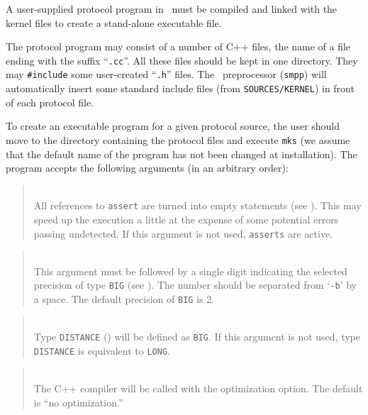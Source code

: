 A user-supplied protocol program in \smurph\ must
be compiled and linked with the kernel
files to create a stand-alone executable file.

The protocol program may consist of a number of C++ files, the name of
a file ending with the suffix ``{\tt .cc}''.
All these files should be kept in one directory.
They may {\tt \#include} some user-created ``{\tt .h}'' files.
The \smurph\ preprocessor ({\tt smpp}) will automatically insert some standard
include files (from {\tt SOURCES/KERNEL}) in front of each protocol file.

To create an executable program for a given protocol source, the user
should move to the directory containing the protocol files and execute
{\tt mks} (we assume that the default name of the program has not been
changed at installation).
The program accepts the following arguments (in an arbitrary order):

\medskip

\begin{quote}
\noindent{}\\ \hspace{0in}
All references to {\tt assert} are turned into empty statements
(see ).
This may speed up the execution a little at the expense of some potential
errors passing undetected.
If this argument is not used, {\tt asserts} are active.
\end{quote}

\begin{quote}
\noindent{}\\ \hspace{0in}
This argument must be followed by a single digit indicating the selected
precision of type {\tt BIG} (see ).
The number should be separated from `{\tt -b}' by a space.
The default precision of {\tt BIG} is 2.
\end{quote}

\begin{quote}
\noindent{}\\ \hspace{0in}
Type {\tt DISTANCE} () will be defined as {\tt BIG}.
If this argument is not used, type {\tt DISTANCE} is equivalent to {\tt LONG}.
\end{quote}

\begin{quote}
\noindent{}\\ \hspace{0in}
The C++ compiler will be called with the optimization option.
The default is ``no optimization.''
\end{quote}


